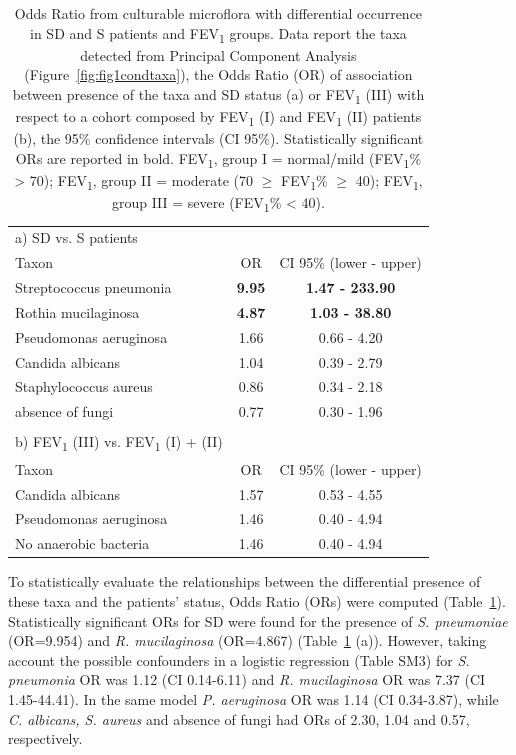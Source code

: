 \begin{table}
\centering
\scriptsize
\begin{tabular}{l c c}
\hline
a) SD vs. S patients &  & \\		
Taxon & OR & CI 95\% (lower - upper) \\
\hline\hline
Streptococcus pneumonia & \textbf{9.95} & \textbf{1.47 - 233.90} \\
Rothia mucilaginosa & \textbf{4.87} & \textbf{1.03 - 38.80} \\
Pseudomonas aeruginosa & 1.66 & 0.66 - 4.20 \\
Candida albicans & 1.04 & 0.39 - 2.79 \\
Staphylococcus aureus & 0.86 & 0.34 - 2.18 \\
absence of fungi & 0.77 & 0.30 - 1.96 \\
  &  &  \\
b) FEV\textsubscript{1} (III) vs. FEV\textsubscript{1} (I) + (II) &  & \\
Taxon & OR & CI 95\% (lower - upper) \\
\hline\hline
Candida albicans & 1.57 & 0.53 - 4.55 \\
Pseudomonas aeruginosa & 1.46 & 0.40 - 4.94 \\
No anaerobic bacteria & 1.46 & 0.40 - 4.94 \\
\hline
\end{tabular}
\caption{\label{tab:ortrflp}Odds Ratio from culturable microflora with differential occurrence in SD and S patients and FEV\textsubscript{1} groups. Data report the taxa detected from Principal Component Analysis (Figure~\ref{fig:fig1condtaxa}), the Odds Ratio (OR) of association between presence of the taxa and SD status (a) or FEV\textsubscript{1} (III) with respect to a cohort composed by FEV\textsubscript{1} (I) and FEV\textsubscript{1} (II) patients (b), the 95\% confidence intervals (CI 95\%). Statistically significant ORs are reported in bold. FEV\textsubscript{1}, group I = normal/mild (FEV\textsubscript{1}\% {\textgreater} 70); FEV\textsubscript{1}, group II = moderate (70 ${ \geq}$ FEV\textsubscript{1}\% ${\geq}$ 40); FEV\textsubscript{1}, group III = severe (FEV\textsubscript{1}\% {\textless} 40).}
\end{table}
To statistically evaluate the relationships between the differential presence of these taxa and the patients' status, Odds Ratio (ORs) were computed (Table~\ref{tab:ortrflp}). Statistically significant ORs for SD were found for the presence of \textit{S. pneumoniae} (OR=9.954) and \textit{R. mucilaginosa} (OR=4.867) (Table~\ref{tab:ortrflp} (a)). However, taking account the possible confounders in a logistic regression (Table SM3) for \textit{S. pneumonia }OR was 1.12 (CI 0.14-6.11) and \textit{R. mucilaginosa} OR was 7.37 (CI 1.45-44.41). In the same model \textit{P. aeruginosa} OR was 1.14 (CI 0.34-3.87), while \textit{C. albicans, S. aureus }and absence of fungi had ORs of 2.30, 1.04 and 0.57, respectively.\\%
